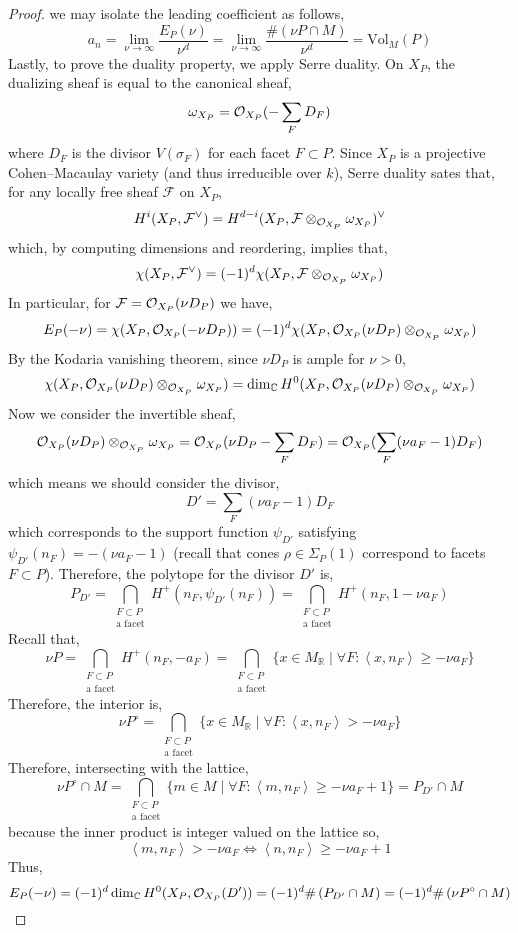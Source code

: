 \documentclass[12pt]{extarticle}
\newcommand{\R}{\mathbb{R}}
\newcommand{\C}{\mathbb{C}}
\theoremstyle{definition}
\newcommand{\F}{\mathcal{F}}
\newcommand{\Vol}[2]{\mathrm{Vol}_{#1}\left( #2 \right)}
\newcommand{\inner}[2]{\left< #1, #2 \right>}
\begin{document}
\begin{proof}
we may isolate the leading coefficient as follows,
\[ a_n = \lim_{\nu \to \infty} \frac{E_P(\nu)}{\nu^d} = \lim_{\nu \to \infty} \frac{\# \left( \nu P \cap M \right)}{\nu^d} = \Vol{M}{P} \] 
Lastly, to prove the duality property, we apply Serre duality. On $X_P$, the dualizing sheaf is equal to the canonical sheaf,
\[ \omega_{X_P} = \mathcal{O}_{X_P}( - \sum_F D_F) \]
where $D_F$ is the divisor $V(\sigma_F)$ for each facet $F \subset P$. Since $X_P$ is a projective Cohen–Macaulay variety (and thus irreducible over $k$), Serre duality sates that, for any locally free sheaf $\F$ on $X_P$,
\[ H^i(X_P, \F^\vee) = H^{d - i}(X_P, \F \otimes_{\struct{X_P}} \omega_{X_P})^\vee \]
which, by computing dimensions and reordering, implies that,
\[ \chi(X_P, \F^\vee) = (-1)^d \chi(X_P, \F \otimes_{\struct{X_P}} \omega_{X_P}) \]
In particular, for $\F = \struct{X_P}(\nu D_P)$ we have,
\[ E_P(-\nu) = \chi(X_P, \mathcal{O}_{X_P}(- \nu D_P)) = (-1)^d \chi(X_P, \mathcal{O}_{X_P}(\nu D_P) \otimes_{\mathcal{O}_{X_P}} \omega_{X_P}) \]
By the Kodaria vanishing theorem, since $\nu D_P$ is ample for $\nu > 0$, 
\[ \chi(X_P, \struct{X_P}(\nu D_P) \otimes_{\struct{X_P}} \omega_{X_P}) = \dim_\C H^0(X_P, \struct{X_P}(\nu D_P) \otimes_{\struct{X_P}} \omega_{X_P}) \]
Now we consider the invertible sheaf,
\[ \mathcal{O}_{X_P}(\nu D_P) \otimes_{\mathcal{O}_{X_P}} \omega_{X_P} = \mathcal{O}_{X_P}(\nu D_P - \sum_F D_F) = \mathcal{O}_{X_P}(\sum_F (\nu a_F - 1) D_F) \]
which means we should consider the divisor,
\[ D' = \sum_F (\nu a_F - 1) D_F \]
which corresponds to the support function $\psi_{D'}$ satisfying $\psi_{D'}(n_F) = -(\nu a_F - 1)$ (recall that cones $\rho \in \Sigma_P(1)$ correspond to facets $F \subset P$). Therefore, the polytope for the divisor $D'$ is,
\[ P_{D'} = \bigcap_{\substack{F \subset P \\ \text{a facet}}} H^+(n_F, \psi_{D'}(n_F)) = \bigcap_{\substack{F \subset P \\ \text{a facet}}} H^+(n_F, 1 - \nu a_F) \]
Recall that,
\[ \nu P = \bigcap_{\substack{F \subset P \\ \text{a facet}}} H^+(n_F, -a_F) = \bigcap_{\substack{F \subset P \\ \text{a facet}}} \{ x \in M_\R \mid \forall F : \inner{x}{n_F} \ge - \nu a_F \} \]
Therefore, the interior is,
\[ \nu P^\circ  = \bigcap_{\substack{F \subset P \\ \text{a facet}}} \{ x \in M_\R \mid \forall F : \inner{x}{n_F} > - \nu a_F \} \]
Therefore, intersecting with the lattice,
\[ \nu P^\circ \cap M = \bigcap_{\substack{F \subset P \\ \text{a facet}}} \{ m \in M \mid \forall F : \inner{m}{n_F} \ge - \nu a_F + 1 \} = P_{D'} \cap M \]
because the inner product is integer valued on the lattice so,
\[ \inner{m}{n_F} > - \nu a_F \iff \inner{n}{n_F} \ge - \nu a_F + 1 \]
Thus,
\[ E_P(-\nu) = (-1)^d \dim_{\C} H^0(X_P, \struct{X_P}(D')) = (-1)^d \# \left( P_{D'} \cap M \right) = (-1)^d \# \left( \nu P^\circ \cap M \right) \]
\end{proof}
\end{document}
